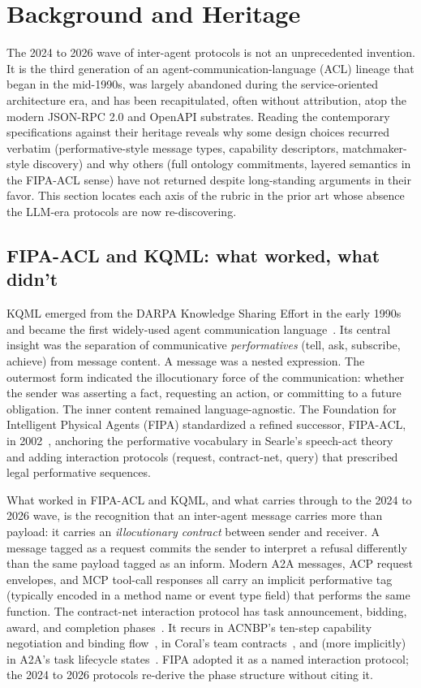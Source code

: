 \section{Background and Heritage}
\label{sec:background}

The 2024 to 2026 wave of inter-agent protocols is not an
unprecedented invention. It is the third generation of an
agent-communication-language (ACL) lineage that began in the
mid-1990s, was largely abandoned during the service-oriented
architecture era, and has been recapitulated, often without
attribution, atop the modern JSON-RPC 2.0 and OpenAPI
substrates. Reading the contemporary specifications against their
heritage reveals why some design choices recurred verbatim
(performative-style message types, capability descriptors,
matchmaker-style discovery) and why others (full ontology
commitments, layered semantics in the FIPA-ACL sense) have not
returned despite long-standing arguments in their favor. This
section locates each axis of the rubric in the prior art whose
absence the LLM-era protocols are now re-discovering.

\subsection{FIPA-ACL and KQML: what worked, what didn't}
\label{sec:background:fipa-kqml}

KQML emerged from the DARPA Knowledge Sharing Effort in the
early 1990s and became the first widely-used agent communication
language~\cite{finin1997kqml}. Its central insight was the
separation of communicative \emph{performatives} (tell, ask,
subscribe, achieve) from message content. A message was a
nested expression. The outermost form indicated the
illocutionary force of the communication: whether the sender
was asserting a fact, requesting an action, or committing to a
future obligation. The inner content remained
language-agnostic. The Foundation for Intelligent Physical
Agents (FIPA) standardized a refined successor, FIPA-ACL,
in 2002~\cite{fipa_acl}, anchoring the performative vocabulary
in Searle's speech-act theory~\cite{searle1969speechacts} and
adding interaction protocols (request, contract-net, query)
that prescribed legal performative sequences.

What worked in FIPA-ACL and KQML, and what carries through to the
2024 to 2026 wave, is the recognition that an inter-agent message
carries more than payload: it carries an \emph{illocutionary
contract} between sender and receiver. A message tagged as a
request commits the sender to interpret a refusal differently
than the same payload tagged as an inform. Modern A2A messages,
ACP request envelopes, and MCP tool-call responses all carry an
implicit performative tag (typically encoded in a method name or
event type field) that performs the same function. The
contract-net interaction protocol has task announcement, bidding,
award, and completion phases~\cite{smith1980contractnet}. It
recurs in ACNBP's ten-step capability
negotiation and binding flow~\cite{spec_acnbp}, in Coral's team
contracts~\cite{spec_coral}, and (more implicitly) in A2A's
task lifecycle states~\cite{spec_a2a}. FIPA adopted it as a
named interaction protocol; the 2024 to 2026 protocols
re-derive the phase structure without citing it.

